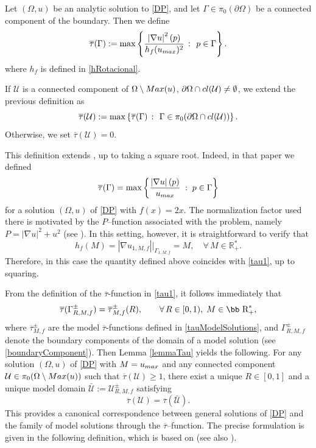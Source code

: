 \documentclass[11pt]{article}
\def\r{\hbox{\bb R}}
\newcommand{\U}{\mathcal{U}}
\newcommand{\abs}[1]{\left\vert #1 \right\vert}
\newcommand{\set}[1]{\left\{#1\right\}}
\numberwithin{equation} {section}
\begin{document}
\begin{definition}\label{DefinTau}
Let $(\Omega, u)$ be an analytic solution to \eqref{DP}, and let $\Gamma \in \pi_{0} (\partial \Omega)$ be a connected component of the boundary. Then we define
\begin{equation}\label{tau1}
\overline{\tau}(\Gamma):=  \max \set{
\frac{\abs{\nabla u}^2 (p)}{ h_f(u_{\rm max})^2} ~\colon~ p \in \Gamma }.
\end{equation}where $h_f$ is defined in \eqref{hRotacional}.

If $\mathcal{U}$ is a connected component of $\Omega \setminus \textup{Max} (u)$, $\partial \Omega \cap \textup{cl}(\U) \neq \emptyset$, we extend the previous definition as
	\begin{equation*}
		\overline{\tau}(\mathcal{U}):= \max \left\{ \overline{\tau}(\Gamma) ~\colon~ \Gamma \in \pi_{0} ( \partial \Omega \cap \textup{cl}(\U) ) \right\}.
	\end{equation*}
Otherwise, we set $\overline{\tau}(\mathcal{U})=0$.
\end{definition}
\begin{remark}
This definition extends \cite[Definition~3.3]{EMa}, up to taking a square root. Indeed, in that paper we defined
\[
\overline{\tau} (\Gamma) = \max \left\{
\frac{\abs{\nabla u}(p)}{u_{\rm max}} \;:\; p \in \Gamma
\right\}
\]
for a solution $(\Omega, u)$ of \eqref{DP} with $f(x)=2x$. The normalization factor used there is motivated by the $P$--function associated with the problem, namely $P = \abs{\nabla u}^2 + u^2$ (see \cite[Proposition~3.1]{EMa}). In this setting, however, it is straightforward to verify that
\[
h_f(M) = \abs{\nabla u_{1,M,f}} |_{\Gamma_{1,M,f}} = M, 
\quad \forall\, M \in \mathbb{R}_+^*.
\]
Therefore, in this case the quantity defined above coincides with \eqref{tau1}, up to squaring.
\end{remark}

From the definition of the $\overline{\tau}$-function in \eqref{tau1}, it follows immediately that
\[
\overline{\tau} (\Gamma_{R,M,f}^{\pm}) = \overline{\tau}_{M,f}^\pm  (R), 
\qquad \forall\, R \in [0,1), \; M \in \r_+^*,
\]
where $\overline{\tau}_{M,f}^\pm $ are the model $\overline{\tau}$-functions defined in \eqref{tauModelSolutions}, and 
$\Gamma_{R,M,f}^{\pm}$ denote the boundary components of the domain of a model solution (see \eqref{boundaryComponent}). Then Lemma \ref{lemmaTau} yields the following. For any solution $(\Omega,u)$ of \eqref{DP} with $M=u_{\textup{max}}$ and any connected component $\mathcal{U}\in \pi_0(\Omega \setminus \textup{Max}(u))$ such that $\overline{\tau}(\mathcal{U})\ge 1$, there exist a unique $R\in[0,1]$ and a unique model domain $\bar{\mathcal{U}}:=\U^{\pm}_{R,M,f}$ satisfying
\[
\overline{\tau}(\mathcal{U})=\overline{\tau}(\bar{\mathcal{U}}).
\]
This provides a canonical correspondence between general solutions of \eqref{DP} and the family of model solutions through the $\overline{\tau}$--function. The precise formulation is given in the following definition, which is based on \cite[Definition 3.5]{EMa} (see also \cite[Definition 1.4]{ABM}).
\end{document}

